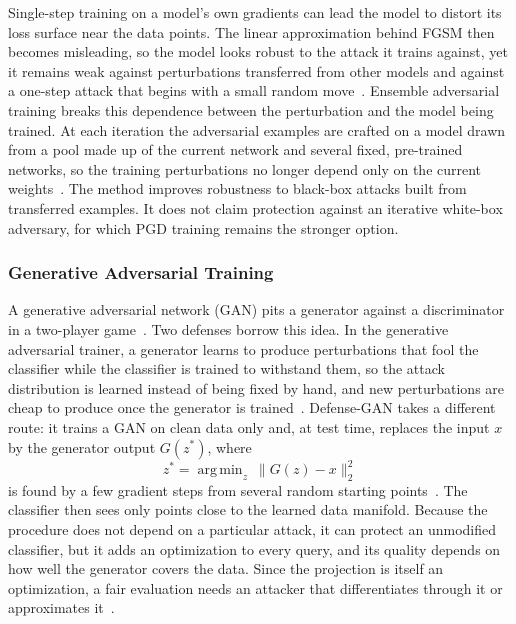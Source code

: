 \documentclass[12pt]{article}
\DeclareMathOperator*{\argmin}{arg\,min}
\begin{document}
Single-step training on a model's own gradients can lead the model to distort its loss surface near the data points. The linear approximation behind FGSM then becomes misleading, so the model looks robust to the attack it trains against, yet it remains weak against perturbations transferred from other models and against a one-step attack that begins with a small random move~\cite{tramer2018}. Ensemble adversarial training breaks this dependence between the perturbation and the model being trained. At each iteration the adversarial examples are crafted on a model drawn from a pool made up of the current network and several fixed, pre-trained networks, so the training perturbations no longer depend only on the current weights~\cite{tramer2018}. The method improves robustness to black-box attacks built from transferred examples. It does not claim protection against an iterative white-box adversary, for which PGD training remains the stronger option.

\subsubsection{Generative Adversarial Training}

A generative adversarial network (GAN) pits a generator against a discriminator in a two-player game~\cite{goodfellow2014gan}. Two defenses borrow this idea. In the generative adversarial trainer, a generator learns to produce perturbations that fool the classifier while the classifier is trained to withstand them, so the attack distribution is learned instead of being fixed by hand, and new perturbations are cheap to produce once the generator is trained~\cite{lee2017}. Defense-GAN takes a different route: it trains a GAN on clean data only and, at test time, replaces the input $x$ by the generator output $G(z^{*})$, where
\begin{equation}
  z^{*} = \argmin_{z}\ \lVert G(z) - x \rVert_2^{2}
\end{equation}
is found by a few gradient steps from several random starting points~\cite{samangouei2018}. The classifier then sees only points close to the learned data manifold. Because the procedure does not depend on a particular attack, it can protect an unmodified classifier, but it adds an optimization to every query, and its quality depends on how well the generator covers the data. Since the projection is itself an optimization, a fair evaluation needs an attacker that differentiates through it or approximates it~\cite{athalye2018}.
\end{document}
